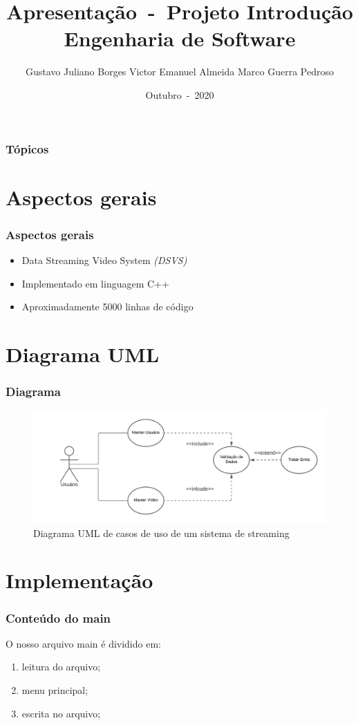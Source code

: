 \documentclass{beamer}
\author{Gustavo Juliano Borges \linebreak Victor Emanuel Almeida \linebreak Marco Guerra Pedroso}
\title{Apresentação~-~Projeto Introdução Engenharia de Software}
\date{Outubro~-~2020}
\begin{document}
	\frame{\titlepage}

	\begin{frame}
		\frametitle{Tópicos}
		\tableofcontents
	\end{frame}

	\section{Aspectos gerais}
	\begin{frame}
		\frametitle{Aspectos gerais}
		\begin{itemize}
			\item Data Streaming Video System \textit{(DSVS)} \linebreak
			
			\item Implementado em linguagem C++ \linebreak
			
			\item Aproximadamente 5000 linhas de código \linebreak
		\end{itemize}
	\end{frame}

	\section{Diagrama UML}
	\begin{frame}
		\frametitle{Diagrama}
		\begin{figure}[!htb]
			\centering
			\includegraphics[scale=.5]{images/DiagramaUML.png}
			\caption{\label{fig:}Diagrama UML de casos de uso de um sistema de streaming}
		\end{figure}
	\end{frame}

	\section{Implementação}
	\begin{frame}
		\frametitle{Conteúdo do main}
		O nosso arquivo main é dividido em:
		\begin{enumerate}
			\item leitura do arquivo;
			\item menu principal;
			\item escrita no arquivo;
		\end{enumerate}
	\end{frame}
\end{document}
